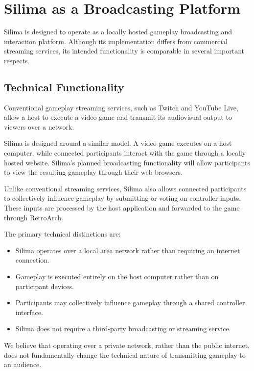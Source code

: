 \section{Silima as a Broadcasting Platform}

Silima is designed to operate as a locally hosted gameplay
broadcasting and interaction platform. Although its
implementation differs from commercial streaming services,
its intended functionality is comparable in several
important respects.

\subsection{Technical Functionality}

Conventional gameplay streaming services, such as Twitch
and YouTube Live, allow a host to execute a video game
and transmit its audiovisual output to viewers over
a network.

Silima is designed around a similar model. A video game
executes on a host computer, while connected participants
interact with the game through a locally hosted website.
Silima's planned broadcasting functionality will allow
participants to view the resulting gameplay through
their web browsers.

Unlike conventional streaming services, Silima also
allows connected participants to collectively influence
gameplay by submitting or voting on controller inputs.
These inputs are processed by the host application and
forwarded to the game through RetroArch.

The primary technical distinctions are:
\begin{itemize}
    \item Silima operates over a local area network
          rather than requiring an internet connection.
    \item Gameplay is executed entirely on the host
          computer rather than on participant devices.
    \item Participants may collectively influence
          gameplay through a shared controller interface.
    \item Silima does not require a third-party
          broadcasting or streaming service.
\end{itemize}

We believe that operating over a private network,
rather than the public internet, does not fundamentally
change the technical nature of transmitting gameplay
to an audience.

